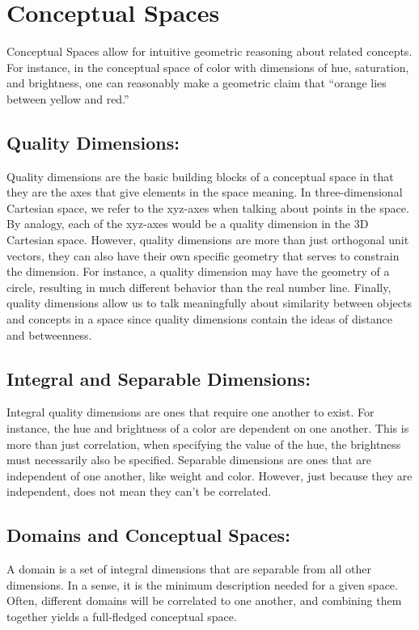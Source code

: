 \chapter{Conceptual Spaces}
Conceptual Spaces allow for intuitive geometric reasoning about related concepts. For instance, in the conceptual space of color with dimensions of hue, saturation, and brightness, one can reasonably make a geometric claim that “orange lies between yellow and red.”

\section{Quality Dimensions:}
Quality dimensions are the basic building blocks of a conceptual space in that they are the axes that give elements in the space meaning.  In three-dimensional Cartesian space, we refer to the xyz-axes when talking about points in the space.  By analogy, each of the xyz-axes would be a quality dimension in the 3D Cartesian space.  However, quality dimensions are more than just orthogonal unit vectors, they can also have their own specific geometry that serves to constrain the dimension. For instance, a quality dimension may have the geometry of a circle, resulting in much different behavior than the real number line.  Finally, quality dimensions allow us to talk meaningfully about similarity between objects and concepts in a space since quality dimensions contain the ideas of distance and betweenness.

\section{Integral and Separable Dimensions:}
Integral quality dimensions are ones that require one another to exist.  For instance, the hue and brightness of a color are dependent on one another. This is more than just correlation, when specifying the value of the hue, the brightness must necessarily also be specified.  Separable dimensions are ones that are independent of one another, like weight and color.  However, just because they are independent, does not mean they can't be correlated.

\section{Domains and Conceptual Spaces:}
A domain is a set of integral dimensions that are separable from all other dimensions.  In a sense, it is the minimum description needed for a given space.  Often, different domains will be correlated to one another, and combining them together yields a full-fledged conceptual space.

